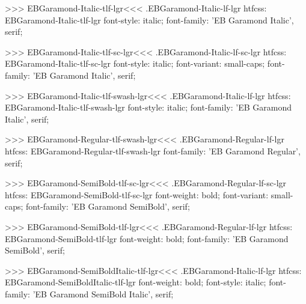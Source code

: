 >>>
\<EBGaramond-Italic-tlf-lgr\><<<
.EBGaramond-Italic-lf-lgr
htfcss:  EBGaramond-Italic-tlf-lgr  font-style: italic; font-family: 'EB Garamond Italic', serif;

>>>
\<EBGaramond-Italic-tlf-sc-lgr\><<<
.EBGaramond-Italic-lf-sc-lgr
htfcss:  EBGaramond-Italic-tlf-sc-lgr  font-style: italic; font-variant: small-caps; font-family: 'EB Garamond Italic', serif;

>>>
\<EBGaramond-Italic-tlf-swash-lgr\><<<
.EBGaramond-Italic-lf-lgr
htfcss:  EBGaramond-Italic-tlf-swash-lgr  font-style: italic; font-family: 'EB Garamond Italic', serif;

>>>
\<EBGaramond-Regular-tlf-swash-lgr\><<<
.EBGaramond-Regular-lf-lgr
htfcss:  EBGaramond-Regular-tlf-swash-lgr  font-family: 'EB Garamond Regular', serif;

>>>
\<EBGaramond-SemiBold-tlf-sc-lgr\><<<
.EBGaramond-Regular-lf-sc-lgr
htfcss:  EBGaramond-SemiBold-tlf-sc-lgr  font-weight: bold; font-variant: small-caps; font-family: 'EB Garamond SemiBold', serif;

>>>
\<EBGaramond-SemiBold-tlf-lgr\><<<
.EBGaramond-Regular-lf-lgr
htfcss:  EBGaramond-SemiBold-tlf-lgr  font-weight: bold; font-family: 'EB Garamond SemiBold', serif;

>>>
\<EBGaramond-SemiBoldItalic-tlf-lgr\><<<
.EBGaramond-Italic-lf-lgr
htfcss:  EBGaramond-SemiBoldItalic-tlf-lgr  font-weight: bold; font-style: italic; font-family: 'EB Garamond SemiBold Italic', serif;

